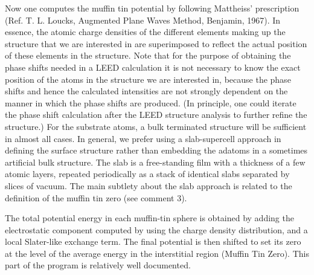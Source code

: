 \documentclass[letterpaper,10pt,english]{sphinxmanual}
\begin{document}
Now one computes the muffin tin potential by following Mattheiss'
prescription (Ref. T. L. Loucks, Augmented Plane Waves Method,
Benjamin, 1967). In essence, the atomic charge densities of the
different elements making up the structure that we are
interested in are superimposed to reflect the actual position of
these elements in the structure. Note that for the purpose of
obtaining the phase shifts needed in a LEED calculation it is not
necessary to know the exact position of the atoms in the structure
we are interested in, because the phase shifts and hence the
calculated intensities are not strongly dependent on the manner in
which the phase shifts are produced. (In principle, one could
iterate the phase shift calculation after the LEED structure
analysis to further refine the structure.) For the substrate atoms,
a bulk terminated structure will be sufficient in almost all cases.
In general, we prefer using a slab-supercell approach in defining
the surface structure rather than embedding the adatoms in a
sometimes artificial bulk structure. The slab is a free-standing
film with a thickness of a few atomic layers, repeated periodically
as a stack of identical slabs separated by slices of vacuum. The
main subtlety about the slab approach is related to the definition
of the muffin tin zero (see comment 3).

The total potential energy in each muffin-tin sphere is obtained
by adding the electrostatic component computed by using the charge
density distribution, and a local Slater-like exchange term.
The final potential is then shifted to set its zero at the level
of the average energy in the interstitial region (Muffin Tin Zero).
This part of the program is relatively well documented.
\end{document}
